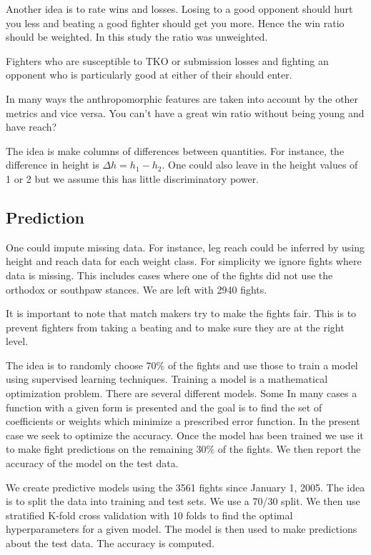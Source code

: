 Another idea is to rate wins and losses. Losing to a good
opponent should hurt you less and beating a good fighter
should get you more. Hence the win ratio should be
weighted. In this study the ratio was unweighted.

Fighters who are susceptible to TKO or submission
losses and fighting an opponent who is particularly
good at either of their should enter.

In many ways the anthropomorphic features are taken
into account by the other metrics and vice versa.
You can't have a great win ratio without being
young and have reach?

The idea is make columns of differences between
quantities. For instance, the difference in
height is $\Delta h = h_1 - h_2$. One could also leave
in the height values of 1 or 2 but we assume this has
little discriminatory power.

\subsection*{Prediction}

One could impute missing data. For instance, leg reach
could be inferred by using height and reach data for
each weight class. For simplicity we ignore fights
where data is missing. This includes cases where one
of the fights did not use the orthodox or southpaw
stances. We are left with 2940 fights.

It is important to note that match makers try to make
the fights fair. This is to prevent fighters from taking
a beating and to make sure they are at the right level.

The idea is to randomly choose 70\% of the fights and
use those to train a model using supervised
learning techniques.
Training a model is a mathematical optimization problem.
There are several different models. Some 
In many cases a function with a given form is presented
and the goal is to find the set of coefficients or weights
which minimize a prescribed error function. In the present
case we seek to optimize the accuracy.
Once the model has been
trained we use it to make fight predictions on
the remaining 30\% of the fights. We then report the
accuracy of the model on the test data.


We create predictive models using the 3561 fights since
January 1, 2005. The idea is to split the data into
training and test sets. We use a 70/30 split. We then
use stratified K-fold cross validation with 10 folds
to find the optimal
hyperparameters for a given model. The model is then
used to make predictions about the test data. The accuracy
is computed.

